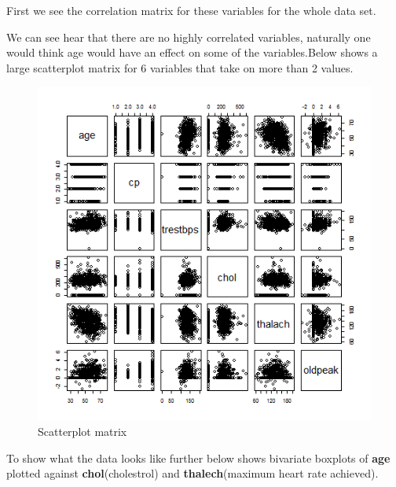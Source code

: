 \documentclass[a4paper]{article}
\begin{document}
First we see the correlation matrix for these variables for the whole data set.


We can see hear that there are no highly correlated variables, naturally one
would think age would have an effect on some of the variables.Below shows a
large scatterplot matrix for 6 variables that take on more than 2 values.

\begin{figure}[H]
	\begin{center}
		\includegraphics[width=12cm]{intro files/intplot2.png}
	\end{center}
	\caption{Scatterplot matrix}
\end{figure}

To show what the data looks like further below shows bivariate boxplots of
\textbf{age} plotted against \textbf{chol}(cholestrol) and
\textbf{thalech}(maximum heart rate achieved).
\end{document}
